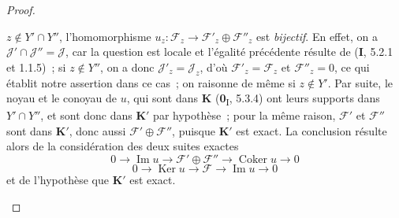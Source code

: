 \begin{proof}
\begin{enumerate}
$z\notin Y'\cap Y''$, l'homomorphisme
$u_z:\mathcal F_z\to\mathcal F'_z\oplus\mathcal F''_z$ est \emph{bijectif}.
En effet, on a $\mathcal J'\cap\mathcal J''=\mathcal J$, car la question est
locale et
l'égalité précédente résulte de (\textbf{I}, 5.2.1 et 1.1.5)~; si $z\notin Y''$, on a
donc $\mathcal J'_z=\mathcal J_z$, d'où $\mathcal F'_z=\mathcal F_z$ et
$\mathcal F''_z=0$, ce qui établit notre assertion dans ce cas~; on raisonne
de même si $z\notin Y'$. Par suite, le noyau et le conoyau de $u$, qui sont
dans $\boldsymbol{K}$ (\textbf{0}\textsubscript{I}, 5.3.4) ont leurs supports dans $Y'\cap Y''$,
et sont donc dans $\boldsymbol{K}'$ par hypothèse~; pour la même raison, $\mathcal F'$ et
$\mathcal F''$ sont dans $\boldsymbol{K}'$, donc aussi $\mathcal F'\oplus\mathcal F''$,
puisque $\boldsymbol{K}'$ est exact. La conclusion résulte alors de la considération des
deux suites exactes
\[
0\longrightarrow\operatorname{Im}u\longrightarrow
\mathcal F'\oplus\mathcal F''\longrightarrow
\operatorname{Coker}u\longrightarrow0
\]
\[
0\longrightarrow\operatorname{Ker}u\longrightarrow\mathcal F
\longrightarrow\operatorname{Im}u\longrightarrow0
\]
et de l'hypothèse que $\boldsymbol{K}'$ est exact.


\end{enumerate}
\end{proof}
